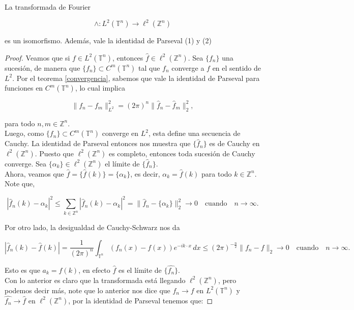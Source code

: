 \documentclass[12pt]{article}
\newcommand\Z{\ensuremath{\mathbb{Z}}}
\newcommand\T{\mathbb{T}}
\renewcommand{\hat}{\widehat}
\begin{document}
\begin{theorem}

La transformada de Fourier

$$
\wedge: L^2\left(\mathbb{T}^n\right) \rightarrow \ell^2\left(\mathbb{Z}^n\right)
$$

es un isomorfismo. Además, vale la identidad de Parseval (1) y (2)
\end{theorem}
\begin{proof}
Veamos que si $f \in L^2(\T^n)$, entonces $\widehat{f} \in \ell^2(\mathbb{Z}^{n})$. Sea $\{f_n\}$ una sucesión, de manera que $\{f_n\}\subset C^{m}(\T^{n}) $ tal que $f_n$ converge a $f$ en el sentido de $L^2$. Por el teorema \ref{convergencia}, sabemos que vale la identidad de Parseval para funciones en $C^{m}(\T^{n}) $, lo cual implica

$$
\|f_n - f_m\|^2_{L^2} = (2\pi)^{n} \|\hat{f}_n - \hat{f}_m\|^2_{2},
$$

para todo $n, m \in \mathbb{Z}^{n}$. \\
Luego, como $\{f_n\} \subset C^{m}(\T^{n})$ converge en $L^2$, esta define una secuencia de Cauchy. La identidad de Parseval entonces nos muestra que $\{\widehat{f}_n\}$ es de Cauchy en $\ell^2(\mathbb{Z}^{n})$. Puesto que $\ell^2(\mathbb{Z}^{n})$ es completo, entonces toda sucesión de Cauchy converge. Sea $\{\alpha_k\} \in \ell^2(\mathbb{Z}^{n})$ el límite de $\{\widehat{f}_n\}$.\\

Ahora, veamos que  $\widehat{f} = \{\widehat{f}(k)\} = \{\alpha_k\}$, es decir, $\alpha_k = \widehat{f}(k)$ para todo $k\in \Z^n$.\\

Note que,

$$
|\widehat{f}_n(k) - \alpha_k|^2 \leq \sum_{k\in\Z^n} |\widehat{f}_n(k) - \alpha_k|^2 = \|\hat{f}_n - \{\alpha_k\}\|^2_{2} \to 0 \quad \text{cuando} \quad n \to \infty.
$$

Por otro lado, la desigualdad de Cauchy-Schwarz nos da

$$
|\widehat{f}_n(k) - \widehat{f}(k)| = \dfrac{1}{(2\pi)^{n}} \int_{\T^n} (f_n(x) - f(x)) e^{-ik\cdot x} \, dx \leq (2\pi)^{-\frac{n}{2}} \|f_n - f\|_2 \to 0 \quad\text{cuando}\quad n\to \infty.
$$

Esto es que  $a_k=\widehat{f}(k)$, en efecto $\widehat{f}$ es el límite de $\{ \widehat{f_n} \}$.\\

Con lo anterior es claro que la transformada está llegando $\ell^2(\Z^n)$, pero podemos decir más, note que lo anterior nos dice que $f_n\to f$ en $L^2(\T^n)$ y $\widehat{f_n}\to \hat{f}$ en $\ell^2(\Z^n)$, por la identidad de Parseval tenemos que:


\end{proof}
\end{document}
